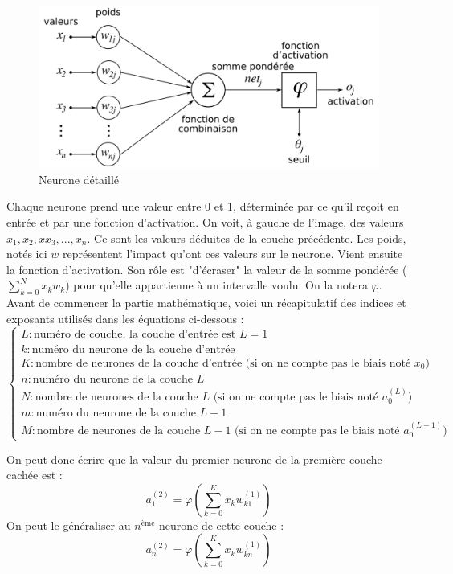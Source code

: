 	\begin{figure}[H]
		\centering
		\includegraphics[width=.75\linewidth]{images/neurone}
		\caption{Neurone détaillé}
	\end{figure}
	
	Chaque neurone prend une valeur entre 0 et 1, déterminée par ce qu'il reçoit en entrée et par une fonction d'activation. On voit, à gauche de l'image, des valeurs $x_1, x_2,x x_3, ..., x_n$. Ce sont les valeurs déduites de la couche précédente. Les poids, notés ici $w$ représentent l'impact qu'ont ces valeurs sur le neurone. Vient ensuite la fonction d'activation. Son rôle est "d'écraser" la valeur de la somme pondérée ($\sum_{k=0}^{N}x_kw_{k}$) pour qu'elle appartienne à un intervalle voulu. On la notera $\varphi$.\\
	
	Avant de commencer la partie mathématique, voici un récapitulatif des indices et exposants utilisés dans les équations ci-dessous :
	$$
	\begin{cases}
		L : \text{numéro de couche, la couche d'entrée est $L = 1$}\\
		k : \text{numéro du neurone de la couche d'entrée}\\
		K : \text{nombre de neurones de la couche d'entrée (si on ne compte pas le biais noté $x_0$)}\\
		n : \text{numéro du neurone de la couche $L$}\\
		N : \text{nombre de neurones de la couche $L$ (si on ne compte pas le biais noté $a_0^{(L)}$)}\\
		m : \text{numéro du neurone de la couche $L-1$}\\
		M : \text{nombre de neurones de la couche $L-1$ (si on ne compte pas le biais noté $a_0^{(L-1)}$)}
	\end{cases}
	$$
	
	On peut donc écrire que la valeur du premier neurone de la première couche cachée est : 
	$$a_1^{(2)} = \varphi\left(\sum_{k=0}^{K}x_kw_{k1}^{(1)}\right)$$
	On peut le généraliser au $n^{\text{ème}}$ neurone de cette couche :
	$$a_n^{(2)} = \varphi\left(\sum_{k=0}^{K}x_kw_{kn}^{(1)}\right)$$
	
